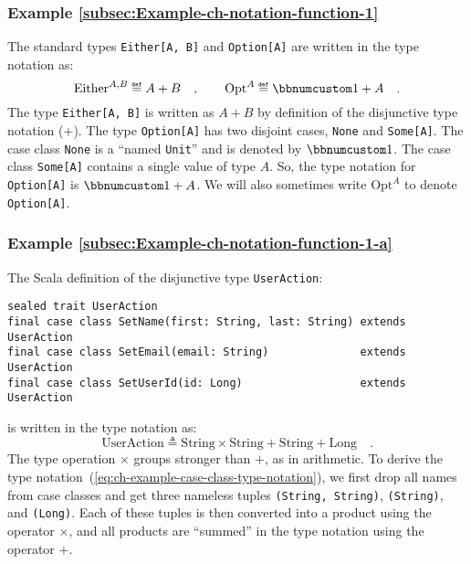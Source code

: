 \subsubsection{Example \label{subsec:Example-ch-notation-function-1}\ref{subsec:Example-ch-notation-function-1}}

The standard types \lstinline!Either[A, B]! and \lstinline!Option[A]!
are written in the type notation as:
\[
\text{Either}^{A,B}\triangleq A+B\quad,\quad\quad\text{Opt}^{A}\triangleq\bbnum 1+A\quad.
\]
The type \lstinline!Either[A, B]! is written as $A+B$ by definition
of the disjunctive type notation ($+$). The type \lstinline!Option[A]!
has two disjoint cases, \lstinline!None! and \lstinline!Some[A]!.
The case class \lstinline!None! is a \textsf{``}named
\lstinline!Unit!\textsf{''} and is denoted by $\bbnum 1$. The case class
\lstinline!Some[A]! contains a single value of type $A$. So, the
type notation for \lstinline!Option[A]! is $\bbnum 1+A$. We will
also sometimes write $\text{Opt}^{A}$ to denote \lstinline!Option[A]!.

\subsubsection{Example \label{subsec:Example-ch-notation-function-1-a}\ref{subsec:Example-ch-notation-function-1-a}}

The Scala definition of the disjunctive type \lstinline!UserAction!:
\begin{lstlisting}
sealed trait UserAction
final case class SetName(first: String, last: String) extends UserAction
final case class SetEmail(email: String)              extends UserAction
final case class SetUserId(id: Long)                  extends UserAction
\end{lstlisting}
is written in the type notation as:
\begin{equation}
\text{UserAction}\triangleq\text{String}\times\text{String}+\text{String}+\text{Long}\quad.\label{eq:ch-example-case-class-type-notation}
\end{equation}
The type operation $\times$ groups stronger than $+$, as in arithmetic.
To derive the type notation~(\ref{eq:ch-example-case-class-type-notation}),
we first drop all names from case classes and get three nameless tuples
\lstinline!(String, String)!, \lstinline!(String)!, and \lstinline!(Long)!.
Each of these tuples is then converted into a product using the operator
$\times$, and all products are \textsf{``}summed\textsf{''} in the type notation
using the operator $+$.

